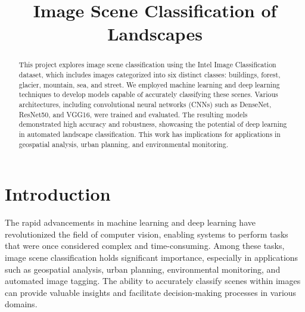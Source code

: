 \documentclass[conference]{IEEEtran}
\begin{document}
\title{Image Scene Classification of Landscapes\\}

\author{
\and
{}
}

\maketitle


\begin{abstract}

This project explores image scene classification using the Intel Image Classification dataset, which includes images categorized into six distinct classes: buildings, forest, glacier, mountain, sea, and street. We employed machine learning and deep learning techniques to develop models capable of accurately classifying these scenes. Various architectures, including convolutional neural networks (CNNs) such as DenseNet, ResNet50, and VGG16, were trained and evaluated. The resulting models demonstrated high accuracy and robustness, showcasing the potential of deep learning in automated landscape classification. This work has implications for applications in geospatial analysis, urban planning, and environmental monitoring.
\end{abstract}

\section{Introduction}

The rapid advancements in machine learning and deep learning have revolutionized the field of computer vision, enabling systems to perform tasks that were once considered complex and time-consuming. Among these tasks, image scene classification holds significant importance, especially in applications such as geospatial analysis, urban planning, environmental monitoring, and automated image tagging. The ability to accurately classify scenes within images can provide valuable insights and facilitate decision-making processes in various domains.
\end{document}
